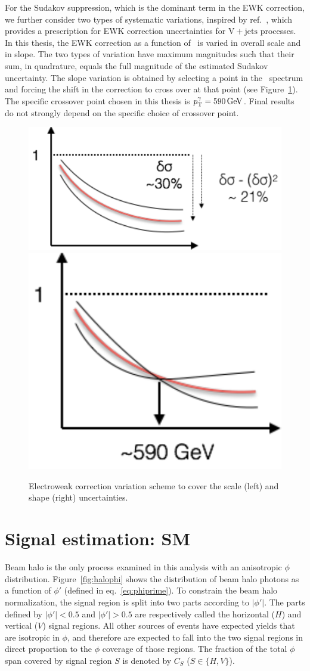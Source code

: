 For the Sudakov suppression, which is the dominant term in the EWK correction, we further
consider two types of systematic variations, inspired by ref.~\cite{ref:epjc/s10052-017-5389-1}, which provides
a prescription for EWK correction uncertainties for $\mathrm{V}+\mathrm{jets}$ processes. In
this thesis, the EWK correction as a function of \pTgamma\ is varied in overall scale and in
slope. The two types of variation have maximum magnitudes such that their sum, in quadrature, equals the full
magnitude of the estimated Sudakov uncertainty. The slope variation is obtained by selecting a point in the \pTgamma\ spectrum and forcing
the shift in the correction to cross over at that point (see Figure~\ref{fig:ewk_correction_cartoon}). The specific crossover
point chosen in this thesis is $\pTgamma = 590\unit{GeV}$. Final results do not strongly depend on the
specific choice of crossover point.

\begin{figure}[htbp]
  \centering
  \includegraphics[height=0.3\linewidth]{Figures/vg/ewk_correction_scale.pdf}
  \includegraphics[height=0.3\linewidth]{Figures/vg/ewk_correction_shape.pdf}
  \caption{
    Electroweak correction variation scheme to cover the scale (left) and shape (right) uncertainties.
  }
  \label{fig:ewk_correction_cartoon}
\end{figure}

\section{Signal estimation: SM} \label{sec:signal_extraction_SM}
Beam halo is the only process examined in this analysis with an anisotropic $\phi$ distribution.
Figure~\ref{fig:halophi} shows the distribution of beam halo photons as a function of $\phi'$ (defined in eq.~\ref{eq:phiprime}).
To constrain the beam halo normalization, the signal region is split into two parts according to $|\phi'|$.
The parts defined by $|\phi'| < 0.5$ and $|\phi'| > 0.5$ are respectively called the horizontal ($H$) and vertical ($V$) signal
regions. All other sources of events have expected yields that are isotropic in $\phi$, and therefore
are expected to fall into the two signal regions in direct proportion to the $\phi$ coverage of those regions.
The fraction of the total $\phi$ span covered by signal region $S$ is denoted by $C_{S}$ ($S \in \{H,V\}$).

